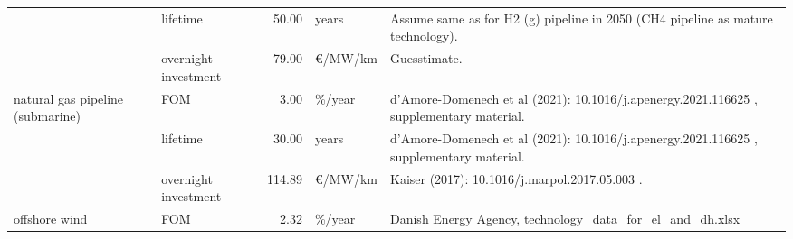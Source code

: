 \begin{longtable}{p{4cm}p{4cm}rp{3cm}p{10cm}}
                      & lifetime &        50.00 &                         years &                                                                                                                                                                                                                                                      Assume same as for H2 (g) pipeline in 2050 (CH4 pipeline as mature technology). \\
                      & overnight investment &        79.00 &                   \euro/MW/km &                                                                                                                                                                                                                                                                                                                         Guesstimate. \\
natural gas pipeline (submarine) & FOM &         3.00 &                       \%/year &                                                                                                                                                                                                                                              d’Amore-Domenech et al (2021): 10.1016/j.apenergy.2021.116625 , supplementary material. \\
                      & lifetime &        30.00 &                         years &                                                                                                                                                                                                                                              d’Amore-Domenech et al (2021): 10.1016/j.apenergy.2021.116625 , supplementary material. \\
                      & overnight investment &       114.89 &                   \euro/MW/km &                                                                                                                                                                                                                                                                                        Kaiser (2017): 10.1016/j.marpol.2017.05.003 . \\
offshore wind & FOM &         2.32 &                       \%/year &                                                                                                                                                                                                                                                                        Danish Energy Agency, technology\_data\_for\_el\_and\_dh.xlsx \\

\end{longtable}
